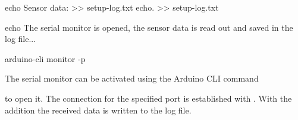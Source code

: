 \medskip


\begin{PowerShell}
echo Sensor data: >> setup-log.txt
echo. >> setup-log.txt
	
echo The serial monitor is opened, the sensor data is 
read out and saved in the log file...
	
arduino-cli monitor -p %
\end{PowerShell}	

\medskip


The serial monitor can be activated using the Arduino CLI command

\medskip

 
\medskip
 
to open it. The connection for the specified port is established with . With the addition  the received data is written to the log file.
